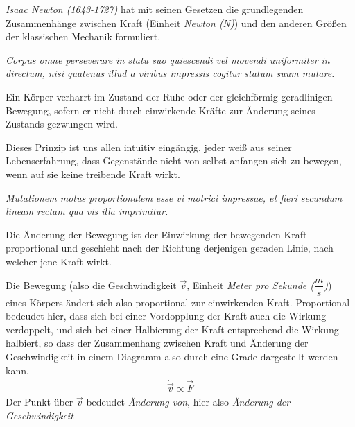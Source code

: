 \textit{Isaac Newton (1643-1727)} hat mit seinen Gesetzen die grundlegenden Zusammenhänge zwischen Kraft (Einheit \textit{Newton (N)}) und den anderen Größen der klassischen Mechanik formuliert.

\begin{mdframed}[backgroundcolor=SRH_Warm_Grey!50,skipabove=3em,skipbelow=1em,frametitle=Newtons erstes Gesetz (Trägheitsprinzip)]
\textit{Corpus omne perseverare in statu suo quiescendi vel movendi uniformiter in directum, nisi quatenus illud a viribus impressis cogitur statum suum mutare.}

Ein Körper verharrt im Zustand der Ruhe oder der gleichförmig geradlinigen Bewegung, sofern er nicht durch einwirkende Kräfte zur Änderung seines Zustands gezwungen wird.
\end{mdframed}

Dieses Prinzip ist uns allen intuitiv eingängig, jeder weiß aus seiner Lebenserfahrung, dass Gegenstände nicht von selbst anfangen sich zu bewegen, wenn auf sie keine treibende Kraft wirkt.

\begin{mdframed}[backgroundcolor=SRH_Warm_Grey!50,skipabove=3em,skipbelow=1em,frametitle=Newtons zweites Gesetz (Aktionsprinzip)]
\textit{Mutationem motus proportionalem esse vi motrici impressae, et fieri secundum lineam rectam qua vis illa imprimitur.}

Die Änderung der Bewegung ist der Einwirkung der bewegenden Kraft proportional und geschieht nach der Richtung derjenigen geraden Linie, nach welcher jene Kraft wirkt.
\end{mdframed}

Die Bewegung (also die Geschwindigkeit $\vec{v}$, Einheit \textit{Meter pro Sekunde ($\dfrac{m}{s}$)}) eines Körpers ändert sich also proportional zur einwirkenden Kraft. Proportional bedeudet hier, dass sich bei einer Vordopplung der Kraft auch die Wirkung verdoppelt, und sich bei einer Halbierung der Kraft entsprechend die Wirkung halbiert, so dass der Zusammenhang zwischen Kraft und Änderung der Geschwindigkeit in einem Diagramm also durch eine Grade dargestellt werden kann.
\begin{eqnarray}
\dot{\vec{v}} \propto \vec{F}
\end{eqnarray}
Der Punkt über $\dot{\vec{v}}$ bedeudet \textit{Änderung von}, hier also \textit{Änderung der Geschwindigkeit}

